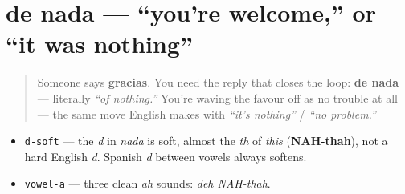 \section[de nada]{de nada — \textquotedblleft{}you're welcome,\textquotedblright{} or \textquotedblleft{}it was nothing\textquotedblright{}}

\label{lesson:ES-C04-de-nada}



\begin{quote}
Someone says \textbf{gracias}. You need the reply that closes the loop: \textbf{de nada} — literally \emph{\textquotedblleft{}of nothing.\textquotedblright{}} You're waving the favour off as no trouble at all — the same move English makes with \emph{\textquotedblleft{}it's nothing\textquotedblright{}} / \emph{\textquotedblleft{}no problem.\textquotedblright{}}
\end{quote}

\begin{sounds}
\begin{itemize}
\raggedright
  \item \texttt{d-soft} — the \emph{d} in \emph{nada} is soft, almost the \emph{th} of \emph{this} (\textbf{NAH-thah}), not a hard English \emph{d}. Spanish \emph{d} between vowels always softens.
  \item \texttt{vowel-a} — three clean \emph{ah} sounds: \emph{deh NAH-thah}.
\end{itemize}
\end{sounds}

